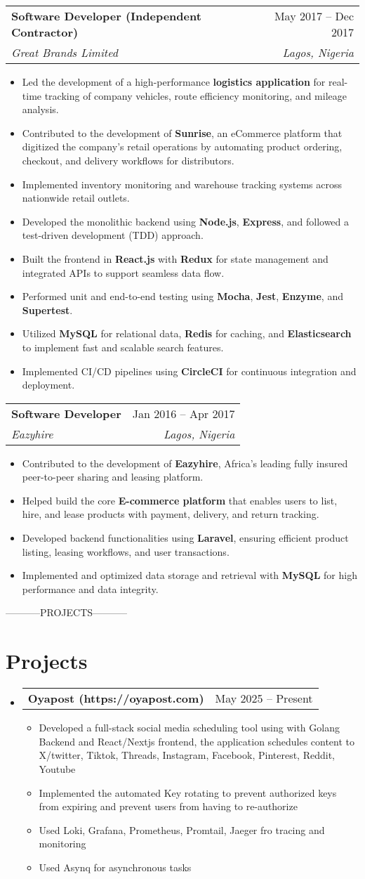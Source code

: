 \documentclass[letterpaper,11pt]{article}
\makeatletter
\newcommand{\resumeItem}[1]{
  \item\small{
    {#1 \vspace{-2pt}}
  }
}
\newcommand{\resumeSubheading}[4]{
  \vspace{-2pt}\item
    \begin{tabular*}{0.97\textwidth}[t]{l@{\extracolsep{\fill}}r}
      \textbf{#1} & #2 \\
      \textit{\small#3} & \textit{\small #4} \\
    \end{tabular*}\vspace{-7pt}
}
\newcommand{\resumeProjectHeading}[2]{
    \item
    \begin{tabular*}{0.97\textwidth}{l@{\extracolsep{\fill}}r}
      \small#1 & #2 \\
    \end{tabular*}\vspace{-7pt}
}
\newcommand{\resumeSubHeadingListStart}{\begin{itemize}[leftmargin=0.15in, label={}]}
\newcommand{\resumeSubHeadingListEnd}{\end{itemize}}
\newcommand{\resumeItemListStart}{\begin{itemize}}
\newcommand{\resumeItemListEnd}{\end{itemize}\vspace{-5pt}}
\makeatother
\begin{document}
  \resumeSubheading
  {Software Developer (Independent Contractor)}{May 2017 -- Dec 2017}
  {Great Brands Limited}{Lagos, Nigeria}
  \resumeItemListStart
    \resumeItem{Led the development of a high-performance \textbf{logistics application} for real-time tracking of company vehicles, route efficiency monitoring, and mileage analysis.}
    \resumeItem{Contributed to the development of \textbf{Sunrise}, an eCommerce platform that digitized the company’s retail operations by automating product ordering, checkout, and delivery workflows for distributors.}
    \resumeItem{Implemented inventory monitoring and warehouse tracking systems across nationwide retail outlets.}
    \resumeItem{Developed the monolithic backend using \textbf{Node.js}, \textbf{Express}, and followed a test-driven development (TDD) approach.}
    \resumeItem{Built the frontend in \textbf{React.js} with \textbf{Redux} for state management and integrated APIs to support seamless data flow.}
    \resumeItem{Performed unit and end-to-end testing using \textbf{Mocha}, \textbf{Jest}, \textbf{Enzyme}, and \textbf{Supertest}.}
    \resumeItem{Utilized \textbf{MySQL} for relational data, \textbf{Redis} for caching, and \textbf{Elasticsearch} to implement fast and scalable search features.}
    \resumeItem{Implemented CI/CD pipelines using \textbf{CircleCI} for continuous integration and deployment.}
  \resumeItemListEnd

  \resumeSubheading
  {Software Developer}{Jan 2016 -- Apr 2017}
  {Eazyhire}{Lagos, Nigeria}
  \resumeItemListStart
    \resumeItem{Contributed to the development of \textbf{Eazyhire}, Africa’s leading fully insured peer-to-peer sharing and leasing platform.}
    \resumeItem{Helped build the core \textbf{E-commerce platform} that enables users to list, hire, and lease products with payment, delivery, and return tracking.}
    \resumeItem{Developed backend functionalities using \textbf{Laravel}, ensuring efficient product listing, leasing workflows, and user transactions.}
    \resumeItem{Implemented and optimized data storage and retrieval with \textbf{MySQL} for high performance and data integrity.}
  \resumeItemListEnd


-----------PROJECTS-----------
\section{Projects}
    \resumeSubHeadingListStart
      \resumeProjectHeading
          {\textbf{Oyapost (https://oyapost.com)} \href{mailto:michgboxy@gmail.com} $|$ \emph{Nextjs, React, Golang PostgreSQL, Docker}}{May 2025 -- Present}
          \resumeItemListStart
            \resumeItem{Developed a full-stack social media scheduling tool using with Golang Backend and React/Nextjs frontend, the application schedules content to X/twitter, Tiktok, Threads, Instagram, Facebook, Pinterest, Reddit, Youtube}
            \resumeItem{Implemented the automated Key rotating to prevent authorized keys from expiring and prevent users from having to re-authorize}
            \resumeItem{Used Loki, Grafana, Prometheus, Promtail, Jaeger fro tracing and monitoring}
            \resumeItem{Used Asynq for asynchronous tasks}
          \resumeItemListEnd
    \resumeSubHeadingListEnd
\end{document}
